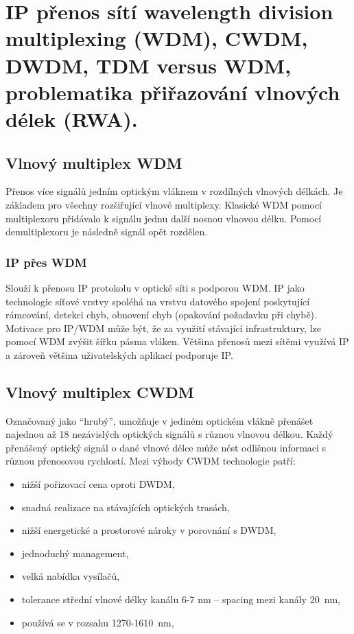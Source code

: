 \clearpage
\section{IP přenos sítí wavelength division multiplexing (WDM), CWDM, DWDM, TDM versus WDM, problematika přiřazování vlnových délek (RWA).}

\subsection{Vlnový multiplex WDM}

Přenos více signálů jedním optickým vláknem v rozdílných vlnových délkách. Je základem pro všechny rozšiřující vlnové multiplexy. Klasické WDM pomocí multiplexoru přidávalo k signálu jednu další nosnou vlnovou délku. Pomocí demultiplexoru je následně signál opět rozdělen.

\subsubsection{IP přes WDM}

Slouží k přenosu IP protokolu v optické síti s podporou WDM. IP jako technologie síťové vrstvy spoléhá na vrstvu datového spojení poskytující rámcování, detekci chyb, obnovení chyb (opakování požadavku při chybě). Motivace pro IP/WDM může být, že za využití stávající infrastruktury, lze pomocí WDM zvýšit šířku pásma vláken. Většina přenosů mezi sítěmi využívá IP a zároveň většina uživatelských aplikací podporuje IP.

\subsection{Vlnový multiplex CWDM }
Označovaný jako \enquote{hrubý}, umožňuje v jediném optickém vlákně přenášet najednou až 18 nezávislých optických signálů s různou vlnovou délkou. Každý přenášený optický signál o dané vlnové délce může nést odlišnou informaci s různou přenosovou rychlostí.
Mezi výhody CWDM technologie patří:
\begin{itemize}
    \item nižší pořizovací cena oproti DWDM,
    \item snadná realizace na stávajících optických trasách,
    \item nižší energetické a prostorové nároky v porovnání s DWDM,
    \item jednoduchý management,
    \item velká nabídka vysílačů,
    \item tolerance střední vlnové délky kanálu 6-7 nm -- spacing mezi kanály 20~nm,
    \item používá se v rozsahu 1270-1610~nm,
\end{itemize}

